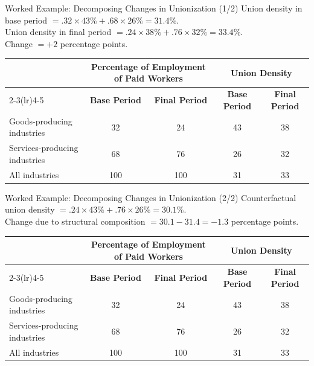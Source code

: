 \documentclass[aspectratio=169]{beamer}
\begin{document}
\begin{frame}{Worked Example: Decomposing Changes in Unionization (1/2)}
\transfade
\small
Union density in base period \(= .32 \times 43\% + .68 \times 26\% = 31.4\%\).\\
Union density in final period \(= .24 \times 38\% + .76 \times 32\% = 33.4\%\).\\
Change \(= +2\) percentage points.
\medskip

\scriptsize
\renewcommand{\arraystretch}{1.05}
\begin{tabular}{lcccc}
\toprule
 & \multicolumn{2}{c}{\textbf{Percentage of Employment of Paid Workers}} & \multicolumn{2}{c}{\textbf{Union Density}} \\
\cmidrule(lr){2-3}\cmidrule(lr){4-5}
 & \textbf{Base Period} & \textbf{Final Period} & \textbf{Base Period} & \textbf{Final Period} \\
\midrule
Goods-producing industries & 32 & 24 & 43 & 38 \\
Services-producing industries & 68 & 76 & 26 & 32 \\
All industries & 100 & 100 & 31 & 33 \\
\bottomrule
\end{tabular}
\end{frame}

\begin{frame}{Worked Example: Decomposing Changes in Unionization (2/2)}
\transfade
\small
Counterfactual union density \(= .24 \times 43\% + .76 \times 26\% = 30.1\%\).\\
Change due to structural composition \(= 30.1 - 31.4 = -1.3\) percentage points.
\medskip

\scriptsize
\renewcommand{\arraystretch}{1.05}
\begin{tabular}{lcccc}
\toprule
 & \multicolumn{2}{c}{\textbf{Percentage of Employment of Paid Workers}} & \multicolumn{2}{c}{\textbf{Union Density}} \\
\cmidrule(lr){2-3}\cmidrule(lr){4-5}
 & \textbf{Base Period} & \textbf{Final Period} & \textbf{Base Period} & \textbf{Final Period} \\
\midrule
Goods-producing industries & 32 & 24 & 43 & 38 \\
Services-producing industries & 68 & 76 & 26 & 32 \\
All industries & 100 & 100 & 31 & 33 \\
\bottomrule
\end{tabular}
\end{frame}
\end{document}
